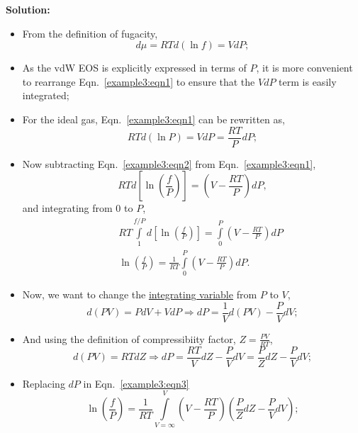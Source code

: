 \documentclass[12pts,a4paper,amsmath,amssymb,floatfix]{article}%
\newcommand{\frc}{\displaystyle\frac}
\begin{document}
\begin{enumerate}[label=\bfseries Example \arabic*]
{\bf Solution:}
\begin{itemize}
  \item From the definition of fugacity,
      \begin{equation}
           d\mu = RTd\left(\ln f\right) = VdP;\label{example3:eqn1}
      \end{equation}
  \item As the vdW EOS is explicitly expressed in terms of $P$, it is more convenient to rearrange Eqn.~\ref{example3:eqn1} to ensure that the $VdP$ term is easily integrated;
  \item For the ideal gas, Eqn.~\ref{example3:eqn1} can be rewritten as,
      \begin{equation}
           RTd\left(\ln P\right) = VdP = \frc{RT}{P}dP;\label{example3:eqn2}
      \end{equation}
  \item Now subtracting Eqn.~\ref{example3:eqn2} from Eqn.~\ref{example3:eqn1},
      \begin{displaymath}
           RTd\left[\ln\left(\frc{f}{P}\right)\right] = \left(V-\frc{RT}{P}\right)dP, 
      \end{displaymath}
      and integrating from $0$ to $P$,
      \begin{eqnarray}
           && RT\int\limits_{1}^{f/P}d\left[\ln\left(\frc{f}{P}\right)\right] = \int\limits_{0}^{P}\left(V-\frc{RT}{P}\right)dP \nonumber \\
           && \ln\left(\frc{f}{P}\right) = \frc{1}{RT} \int\limits_{0}^{P}\left(V-\frc{RT}{P}\right)dP.\label{example3:eqn3}
      \end{eqnarray}
   \item Now, we want to change the \underline{integrating variable} from $P$ to $V$,
      \begin{displaymath}
         d(PV) = PdV + VdP \Longrightarrow dP = \frc{1}{V}d(PV) - \frc{P}{V}dV;
      \end{displaymath}
   \item And using the definition of compressibiity factor, $Z=\frc{PV}{RT}$,
       \begin{displaymath}
          d(PV) = RT dZ \Longrightarrow dP = \frc{RT}{V}dZ - \frc{P}{V}dV = \frc{P}{Z}dZ - \frc{P}{V}dV;
       \end{displaymath}
   \item Replacing $dP$ in Eqn.~\ref{example3:eqn3}
       \begin{equation}
          \ln\left(\frc{f}{P}\right) = \frc{1}{RT} \int\limits_{V=\infty}^{V}\left(V-\frc{RT}{P}\right)\left(\frc{P}{Z}dZ-\frc{P}{V}dV\right)\label{example3:eqn4};

\end{equation}
\end{itemize}
\end{enumerate}
\end{document}

